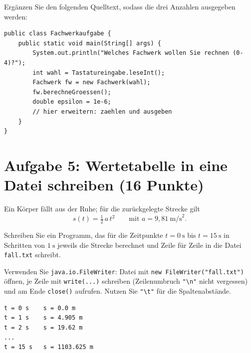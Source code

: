 \documentclass[
	fontsize=12pt,
	paper=a4,
	numbers=noenddot,
	parskip=half,
	openany
]{scrbook}
\begin{document}
Ergänzen Sie den folgenden Quelltext, sodass die drei Anzahlen ausgegeben werden:

\begin{lstlisting}
public class Fachwerkaufgabe {
    public static void main(String[] args) {
        System.out.println("Welches Fachwerk wollen Sie rechnen (0-4)?");
        int wahl = Tastatureingabe.leseInt();
        Fachwerk fw = new Fachwerk(wahl);
        fw.berechneGroessen();
        double epsilon = 1e-6;
        // hier erweitern: zaehlen und ausgeben
    }
}
\end{lstlisting}

\clearpage
\section*{Aufgabe 5: Wertetabelle in eine Datei schreiben \hfill (16 Punkte)}

Ein Körper fällt aus der Ruhe; für die zurückgelegte Strecke gilt
\[ s(t) = \tfrac{1}{2}\,a\,t^2 \qquad \text{mit } a = 9{,}81~\text{m/s}^2. \]

Schreiben Sie ein Programm, das für die Zeitpunkte $t = 0~\text{s}$ bis $t = 15~\text{s}$ in Schritten von $1~\text{s}$ jeweils die Strecke berechnet und Zeile für Zeile in die Datei \texttt{fall.txt} schreibt.

\begin{hinweis}[Hinweis]
	Verwenden Sie \texttt{java.io.FileWriter}: Datei mit \lstinline|new FileWriter("fall.txt")| öffnen, je Zeile mit \texttt{write(...)} schreiben (Zeilenumbruch \lstinline|"\n"| nicht vergessen) und am Ende \texttt{close()} aufrufen.
	Nutzen Sie \lstinline|"\t"| für die Spaltenabstände.
\end{hinweis}

\begin{beispiel}
\begin{lstlisting}[language={}]
t = 0 s    s = 0.0 m
t = 1 s    s = 4.905 m
t = 2 s    s = 19.62 m
...
t = 15 s   s = 1103.625 m
\end{lstlisting}
\end{beispiel}
\end{document}
